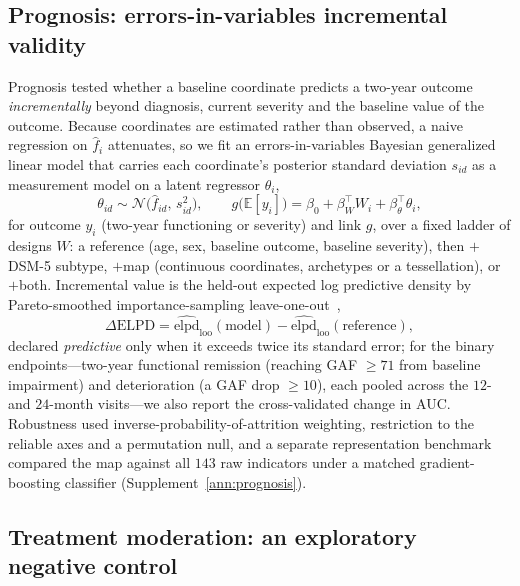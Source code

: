 \subsection{Prognosis: errors-in-variables incremental validity}

Prognosis tested whether a baseline coordinate predicts a two-year outcome \emph{incrementally}
beyond diagnosis, current severity and the baseline value of the outcome. Because coordinates
are estimated rather than observed, a naive regression on $\hat f_i$ attenuates, so we fit an
errors-in-variables Bayesian generalized linear model that carries each coordinate's posterior
standard deviation $s_{id}$ as a measurement model on a latent regressor $\theta_i$,
\begin{equation}
  \theta_{id}\sim\mathcal N\!\big(\hat f_{id},\,s_{id}^{2}\big),\qquad
  g\big(\mathbb E[y_i]\big)=\beta_0+\beta_W^{\top}W_i+\beta_\theta^{\top}\theta_i ,
  \label{eq:m-eiv}
\end{equation}
for outcome $y_i$ (two-year functioning or severity) and link $g$, over a fixed ladder of
designs $W$: a reference (age, sex, baseline outcome, baseline severity), then $+$DSM-5
subtype, $+$map (continuous coordinates, archetypes or a tessellation), or $+$both.
Incremental value is the held-out expected log predictive density by Pareto-smoothed
importance-sampling leave-one-out~\citep{vehtari2017loo},
\begin{equation}
  \Delta\mathrm{ELPD}=\widehat{\mathrm{elpd}}_{\mathrm{loo}}(\text{model})
  -\widehat{\mathrm{elpd}}_{\mathrm{loo}}(\text{reference}),
  \label{eq:m-elpd}
\end{equation}
declared \emph{predictive} only when it exceeds twice its standard error; for the binary
endpoints---two-year functional remission (reaching GAF $\ge71$ from baseline impairment) and
deterioration (a GAF drop $\ge10$), each pooled across the $12$- and $24$-month visits---we
also report the cross-validated change in AUC. Robustness used
inverse-probability-of-attrition weighting, restriction to the reliable axes and a permutation
null, and a separate representation benchmark compared the map against all $143$ raw indicators
under a matched gradient-boosting classifier (Supplement~\ref{ann:prognosis}).

\subsection{Treatment moderation: an exploratory negative control}

